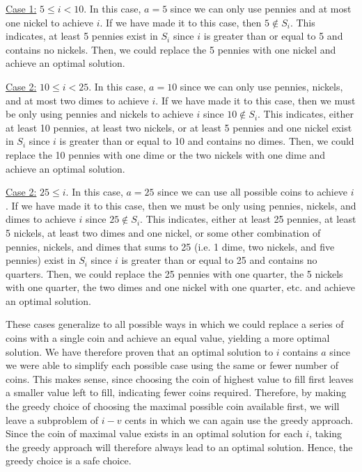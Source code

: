 \documentclass[11pt]{article}
\begin{document}
\underline{Case 1:} $5 \leq i < 10$. In this case, $a = 5$ since we can only use pennies and at most one nickel to achieve $i$. If we have made it to this case, then $5 \notin S_i$. This indicates, at least 5 pennies exist in $S_i$ since $i$ is greater than or equal to 5 and contains no nickels. Then, we could replace the 5 pennies with one nickel and achieve an optimal solution.

\underline{Case 2:} $10 \leq i < 25$. In this case, $a = 10$ since we can only use pennies, nickels, and at most two dimes to achieve $i$. If we have made it to this case, then we must be only using pennies and nickels to achieve $i$ since $10 \notin S_i$. This indicates, either at least 10 pennies, at least two nickels, or at least 5 pennies and one nickel exist in $S_i$ since $i$ is greater than or equal to 10 and contains no dimes. Then, we could replace the 10 pennies with one dime or the two nickels with one dime and achieve an optimal solution.

\underline{Case 2:} $25 \leq i$. In this case, $a = 25$ since we can use all possible coins to achieve $i$. If we have made it to this case, then we must be only using pennies, nickels, and dimes to achieve $i$ since $25 \notin S_i$. This indicates, either at least 25 pennies, at least 5 nickels, at least two dimes and one nickel, or some other combination of pennies, nickels, and dimes that sums to 25 (i.e. 1 dime, two nickels, and five pennies) exist in $S_i$ since $i$ is greater than or equal to 25 and contains no quarters. Then, we could replace the 25 pennies with one quarter, the 5 nickels with one quarter, the two dimes and one nickel with one quarter, etc. and achieve an optimal solution.

These cases generalize to all possible ways in which we could replace a series of coins with a single coin and achieve an equal value, yielding a more optimal solution. We have therefore proven that an optimal solution to $i$ contains $a$ since we were able to simplify each possible case using the same or fewer number of coins. This makes sense, since choosing the coin of highest value to fill first leaves a smaller value left to fill, indicating fewer coins required. Therefore, by making the greedy choice of choosing the maximal possible coin available first, we will leave a subproblem of $i - v$ cents in which we can again use the greedy approach. Since the coin of maximal value exists in an optimal solution for each $i$, taking the greedy approach will therefore always lead to an optimal solution. Hence, the greedy choice is a safe choice.
\end{document}
